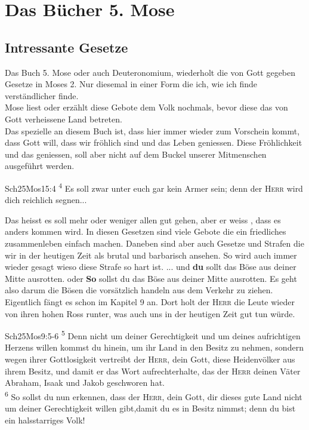 \section{Das Bücher 5. Mose}
\subsection{Intressante Gesetze}

Das Buch 5. Mose oder auch Deuteronomium, wiederholt die von Gott gegeben Gesetze in Moses 2. Nur diesemal in einer Form die ich, wie ich finde verständlicher finde.\\
Mose liest oder erzählt diese Gebote dem Volk nochmals, bevor diese das von Gott verheissene Land betreten.\\
Das spezielle an diesem Buch ist, dass hier immer wieder zum Vorschein kommt, dass Gott will, dass wir fröhlich sind und das Leben geniessen. Diese Fröhlichkeit und das geniessen, soll aber nicht auf dem Buckel unserer Mitmenschen ausgeführt werden. \\
\begin{bibeltext}{Sch2}{5Mos}{15:4}
	\textsuperscript{4} Es soll zwar unter euch gar kein Armer sein; denn der \textsc{Herr} wird dich reichlich segnen...
\end{bibeltext}
Das heisst es soll mehr oder weniger allen gut gehen, aber er weiss , dass es anders kommen wird. In diesen Gesetzen sind viele Gebote die ein friedliches zusammenleben einfach machen. Daneben sind aber auch Gesetze und Strafen die wir in der heutigen Zeit als brutal und barbarisch ansehen. So wird auch immer wieder gesagt wieso diese Strafe so hart ist. \flqq ... und \textbf{du} sollt das Böse aus deiner Mitte ausrotten.\frqq{} oder \flqq \textbf{So} sollst du das Böse aus deiner Mitte ausrotten.\frqq{}
Es geht also darum die Bösen die vorsätzlich handeln aus dem Verkehr zu ziehen.\\
Eigentlich fängt es schon im Kapitel 9 an. Dort holt der \textsc{Herr} die Leute wieder von ihren hohen Ross runter, was auch uns in der heutigen Zeit gut tun würde.
\begin{bibeltext}{Sch2}{5Mos}{9:5-6}
    \textsuperscript{5} Denn nicht um deiner Gerechtigkeit und um deines aufrichtigen Herzens willen kommst du hinein, um ihr Land in den Besitz zu nehmen, sondern wegen ihrer Gottlosigkeit vertreibt der \textsc{Herr}, dein Gott, diese Heidenvölker aus ihrem Besitz, und damit er das Wort aufrechterhalte, das der \textsc{Herr} deinen Väter Abraham, Isaak und Jakob geschworen hat.\\
    \textsuperscript{6} So sollst du nun erkennen, dass der \textsc{Herr}, dein Gott, dir dieses gute Land nicht um deiner Gerechtigkeit willen gibt,damit du es in Besitz nimmst; denn du bist ein halsstarriges Volk!
\end{bibeltext}
